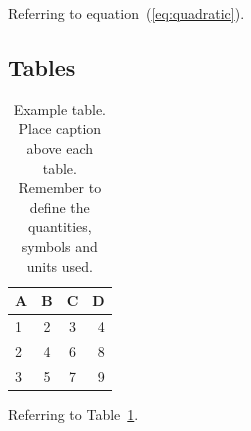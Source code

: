 \documentclass[a4paper,11pt]{article}
\begin{document}
Referring to equation~(\ref{eq:quadratic}).

\subsection{Tables}

\begin{table}[h]
	\centering
	\caption{Example table. Place caption above each table.
	Remember to define the quantities, symbols and units used.}
	\label{tab:example_table}
	\begin{tabular}{lccr} %
		\hline
		A & B & C & D\\
		\hline
		1 & 2 & 3 & 4\\
		2 & 4 & 6 & 8\\
		3 & 5 & 7 & 9\\
		\hline
	\end{tabular}
\end{table}

Referring to Table~\ref{tab:example_table}.



\end{document}
